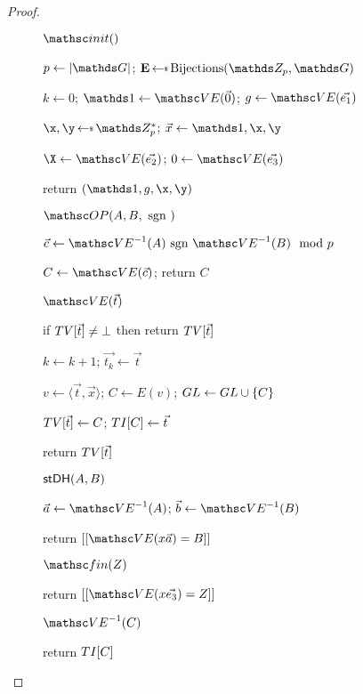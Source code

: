 \begin{proof}
\begin{figure}[tp]
\begin{minipage}[t]{0.49\textwidth}
		\begin{oracle}{$\Initialize()$}
			\item $p \gets |\group|$; $\E \getsr \Bijections(\ZZ_p, \group)$
			\item $k\gets 0$; $\one \gets \VE(\vec{0})$; $\generator\gets \VE(\vec{e_1})$
			\item $\x,\y \getsr \ZZ_p^*$; $\vec{x} \gets {\one,\x,\y}$
			\item $\X \gets \VE(\vec{e_2})$; $\Y\gets \VE(\vec{e_3})$
			\item return $(\one,\generator,\x,\y)$
		\end{oracle}
		\ExptSepSpace
		\begin{oracle}{$\OP(A,B,\sgn)$}
			\item $\vec{c} \gets \VE^{-1}(A) \sgn \VE^{-1}(B) \mod p$
			\item $C \gets \VE(\vec{c})$; return $C$
		\end{oracle}
	\ExptSepSpace
		\begin{algorithm}{$\VE(\vec{t})$}
			\item if $TV[\vec{t}] \neq \bot$ then return $TV[\vec{t}]$
			\item $k \gets k+1$; $\vec{t_k} \gets \vec{t}$
			\item $v \gets \langle \vec{t},\vec{x} \rangle$; $C \gets E(v)$;  $GL \gets GL \cup \{C\}$
			\item  $TV[\vec{t}] \gets C$; $TI[C] \gets \vec{t}$
			\item return $TV[\vec{t}]$
		\end{algorithm}
	\end{minipage}
	\begin{minipage}[t]{0.49\textwidth}
		\ExptSepSpace
		\begin{oracle}{$\mathsf{stDH}(A,B)$}
			\item $\vec{a} \gets \VE^{-1}(A)$; $\vec{b} \gets \VE^{-1}(B)$
			\item return $[[\VE(x \vec{a}) = B]]$
		\end{oracle}
		\ExptSepSpace
		\begin{oracle}{$\Finalize(Z)$}
			\item return $[[\VE(x \vec{e_3}) = Z]]$
		\end{oracle}
	\ExptSepSpace
		\begin{algorithm}{$\VE^{-1}(C)$}
			\item return $TI[C]$
		\end{algorithm}
	\end{minipage}
	

\end{figure}
\end{proof}
